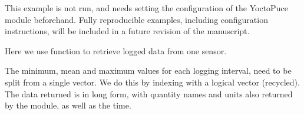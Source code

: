 \documentclass[krantz2]{krantz}\usepackage{knitr}%
\begin{document}
\begin{infobox}
This example is not run, and needs setting the configuration of the YoctoPuce module beforehand. Fully reproducible examples, including configuration instructions, will be included in a future revision of the manuscript.
\end{infobox}

Here we use function  to retrieve logged data from one sensor.

\begin{knitrout}\footnotesize
{}\color{fgcolor}\begin{kframe}
\begin{alltt}
 \hlkwb{<-} 
 \hlkwb{<-}
    \hlstd{(} \hlstd{,}
                    \hlstd{=} \hlstd{))}
\end{alltt}
\end{kframe}
\end{knitrout}

The minimum, mean and maximum values for each logging interval, need to be split from a single vector. We do this by indexing with a logical vector (recycled). The data returned is in long form, with quantity names and units also returned by the module, as well as the time.

\begin{knitrout}\footnotesize
{}\color{fgcolor}\begin{kframe}
\begin{alltt}
     \hlkwb{<-} \hlstd{(Meteo01.lst[[}\hlstd{]])}
    \hlopt{::}
                      \hlstd{=}   \hlstd{=} \hlstd{,}  \hlstd{=} \hlstd{),}
                      
                      
                      \hlstd{= val.vector[}\hlstd{(}\hlstd{,} \hlstd{,} \hlstd{)],}
                      \hlstd{= val.vector[}\hlstd{(}\hlstd{,} \hlstd{,} \hlstd{)],}
                      \hlstd{= val.vector[}\hlstd{(}\hlstd{,} \hlstd{,} \hlstd{)],}
\end{alltt}
\end{kframe}
\end{knitrout}
\end{document}
